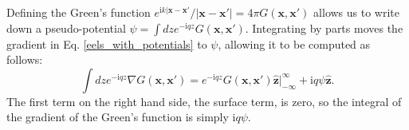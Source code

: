 \documentclass [11pt, proquest] {uwthesis}[2016/11/22]
\begin{document}
Defining the Green's function $e^{\textrm{i}k|\textbf{x}-\textbf{x}'}/|\textbf{x}-\textbf{x}'| = 4\pi G(\textbf{x},\textbf{x}')$ allows us to write down a pseudo-potential $\psi = \int dz e^{-\textrm{i}qz} G(\textbf{x},\textbf{x}')$. Integrating by parts moves the gradient in Eq. \ref{eels_with_potentials} to $\psi$, allowing it to be computed as follows: 
\begin{equation}
\int dz e^{-\textrm{i}qz} \nabla G(\textbf{x},\textbf{x}') = e^{-\textrm{i}qz} G(\textbf{x},\textbf{x}') \hat{\textbf{z}} \Big|_{-\infty}^{\infty} + \textrm{i}q \psi \hat{\textbf{z}}.
\label{psi_integral}
\end{equation}
The first term on the right hand side, the surface term, is zero, so the integral of the gradient of the Green's function is simply $\textrm{i}q\psi$.
\end{document}
